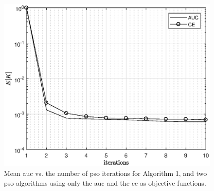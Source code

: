 \documentclass[conference,draftcls,onecolumn]{IEEEtran}
\begin{document}

 
\begin{figure} 
    \centering
    \includegraphics[width=0.9\columnwidth]{newPSO.eps}
    \caption{Mean \ac{auc} vs. the number of \ac{pso} iterations for Algorithm 1, and two \ac{pso} algorithms using only the  \ac{auc} and the \ac{ce} as objective functions. }
    \label{fig:CEvsAUC}
\end{figure}
\end{document}

